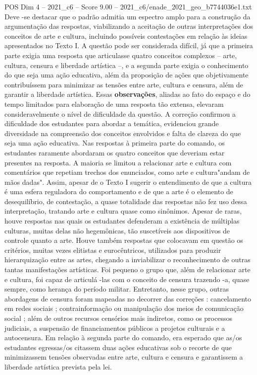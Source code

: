 \begin{textsample}{POS Dim 4 – 2021\_c6 – Score 9.00 – 2021\_c6/enade\_2021\_geo\_b7744036e1.txt}
Deve -se destacar que o padrão admitia um espectro amplo para a construção da argumentação das respostas, viabilizando a aceitação de outras interpretações dos conceitos de arte e cultura, incluindo possíveis contestações em relação às ideias apresentados no Texto I.
A questão pode ser considerada difícil, já que a primeira parte exigia uma resposta que articulasse quatro conceitos complexos – arte, cultura, censura e liberdade artística –, e a segunda parte exigia o conhecimento do que seja uma ação educativa, além da proposição de ações que objetivamente contribuíssem para minimizar as tensões entre arte, cultura e censura, além de garantir a liberdade artística.
Essas \textbf{observações}, aliadas ao fato do espaço e do tempo limitados para elaboração de uma resposta tão extensa, elevaram consideravelmente o nível de dificuldade da questão.
A correção confirmou a dificuldade dos estudantes para abordar a temática, evidenciou grande diversidade na compreensão dos conceitos envolvidos e falta de clareza do que seja uma ação educativa.
Nas respostas à primeira parte do comando, os estudantes raramente abordaram os quatro conceitos que deveriam estar presentes na resposta.
A maioria se limitou a relacionar arte e cultura com comentários que repetiam trechos dos enunciados, como arte e cultura"andam de mãos dadas".
Assim, apesar de o Texto I sugerir o entendimento de que a cultura é uma esfera reguladora do comportamento e de que a arte é o elemento de desequilíbrio, de contestação, a quase totalidade das respostas não fez uso dessa interpretação, tratando arte e cultura quase como sinônimos.
Apesar de raras, houve respostas nas quais os estudantes defenderam a existência de múltiplas culturas, muitas delas não hegemônicas, tão suscetíveis aos dispositivos de controle quanto a arte.
Houve também respostas que colocavam em questão os critérios, muitas vezes elitistas e eurocêntricos, utilizados para produzir hierarquização entre as artes, chegando a inviabilizar o reconhecimento de outras tantas manifestações artísticas.
Foi pequeno o grupo que, além de relacionar arte e cultura, foi capaz de articulá -las com o conceito de censura trazendo -a, quase sempre, como herança do período militar.
Entretanto, nesse grupo, outras abordagens de censura foram mapeadas no decorrer das correções : cancelamento em redes sociais ; contrainformação ou manipulação dos meios de comunicação social ; além de outros recursos censórios mais indiretos, como os processos judiciais, a suspensão de financiamentos públicos a projetos culturais e a autocensura.
Em relação à segunda parte do comando, era esperado que as/os estudantes egressas/os citassem duas ações educativas sob o recorte de que minimizassem tensões observadas entre arte, cultura e censura e garantissem a liberdade artística prevista pela lei.

\end{textsample}
